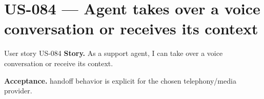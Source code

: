 \Needspace{640pt}
\section{US-084 --- Agent takes over a voice conversation or receives its context}

\begin{storybox}{User story US-084}
\textbf{Story.} As a support agent, I can take over a voice conversation or receive its context.\par
\textbf{Acceptance.} handoff behavior is explicit for the chosen telephony/media provider.
\end{storybox}



